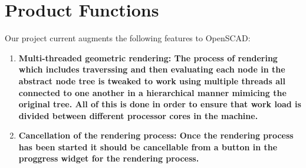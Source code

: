 \section{Product Functions}
Our project current augments the following features to OpenSCAD:
\begin{enumerate}
	\item \bf{Multi-threaded geometric rendering}: The process of rendering which includes traverssing and then evaluating each node in the abstract node tree is tweaked to work using multiple threads all connected to one another in a hierarchical manner mimicing the original tree. All of this is done in order to ensure that work load is divided between different processor cores in the machine.
	\item \bf{Cancellation of the rendering process}: Once the rendering process has been started it should be cancellable from a button in the proggress widget for the rendering process.
\end{enumerate}
